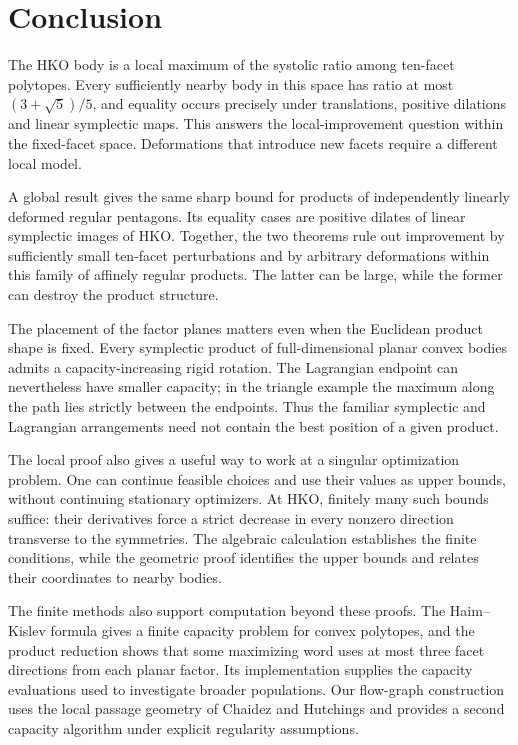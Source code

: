 \clearpage
\section{Conclusion}\label{sec:conclusion}

The HKO body is a local maximum of the systolic ratio among ten-facet
polytopes. Every sufficiently nearby body in this space has ratio at most
$(3+\sqrt5)/5$, and equality occurs precisely under translations, positive
dilations and linear symplectic maps. This answers the local-improvement
question within the fixed-facet space. Deformations that introduce new
facets require a different local model.

A global result gives the same sharp bound for products of independently
linearly deformed regular pentagons. Its equality cases are positive dilates
of linear symplectic images of HKO. Together, the two theorems rule out
improvement by sufficiently small ten-facet perturbations and by arbitrary
deformations within this family of affinely regular products. The latter
can be large, while the former can destroy the product structure.

The placement of the factor planes matters even when the Euclidean product
shape is fixed. Every symplectic product of full-dimensional planar convex
bodies admits a capacity-increasing rigid rotation. The Lagrangian endpoint
can nevertheless have smaller capacity; in the triangle example the maximum
along the path lies strictly between the endpoints. Thus the familiar
symplectic and Lagrangian arrangements need not contain the best position
of a given product.

The local proof also gives a useful way to work at a singular optimization
problem. One can continue feasible choices and use their values as upper
bounds, without continuing stationary optimizers. At HKO, finitely many
such bounds suffice: their derivatives force a strict decrease in every
nonzero direction transverse to the symmetries. The algebraic
calculation establishes the finite conditions, while the geometric proof
identifies the upper bounds and relates their coordinates to nearby bodies.

The finite methods also support computation beyond these proofs. The
Haim--Kislev formula gives a finite capacity problem for convex polytopes,
and the product reduction shows that some maximizing word uses at most three
facet directions from each planar factor. Its implementation supplies the
capacity evaluations used to investigate broader populations. Our flow-graph
construction uses the local passage geometry of Chaidez and Hutchings and
provides a second capacity algorithm under explicit regularity assumptions.

